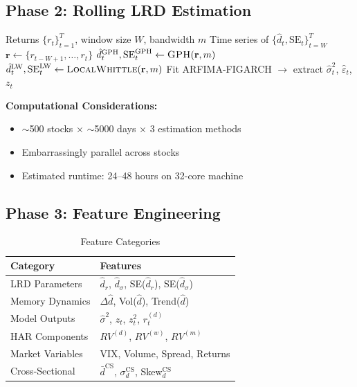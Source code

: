 \documentclass[11pt,a4paper]{article}
\theoremstyle{definition}
\newcommand{\dhat}{\hat{d}}
\newcommand{\sigmahat}{\hat{\sigma}}
\begin{document}
\subsection{Phase 2: Rolling LRD Estimation}

\begin{algorithm}[H]
\caption{Rolling Window LRD Estimation}
\begin{algorithmic}[1]
\Require Returns $\{r_t\}_{t=1}^T$, window size $W$, bandwidth $m$
\Ensure Time series of $\{\dhat_t, \text{SE}_t\}_{t=W}^T$
    \State $\mathbf{r} \gets \{r_{t-W+1}, \ldots, r_t\}$
    \State $\dhat_t^{\text{GPH}}, \text{SE}_t^{\text{GPH}} \gets \textsc{GPH}(\mathbf{r}, m)$
    \State $\dhat_t^{\text{LW}}, \text{SE}_t^{\text{LW}} \gets \textsc{LocalWhittle}(\mathbf{r}, m)$
    \State Fit ARFIMA-FIGARCH $\to$ extract $\sigmahat_t^2$, $\hat{\varepsilon}_t$, $z_t$
\EndFor
\end{algorithmic}
\end{algorithm}

\textbf{Computational Considerations:}
\begin{itemize}
    \item $\sim$500 stocks $\times$ $\sim$5000 days $\times$ 3 estimation methods
    \item Embarrassingly parallel across stocks
    \item Estimated runtime: 24--48 hours on 32-core machine
\end{itemize}

\subsection{Phase 3: Feature Engineering}

\begin{table}[htbp]
\centering
\caption{Feature Categories}
\begin{tabular}{@{}p{3cm}p{9cm}@{}}
\toprule
\textbf{Category} & \textbf{Features} \\
\midrule
LRD Parameters & $\dhat_r$, $\dhat_\sigma$, SE($\dhat_r$), SE($\dhat_\sigma$) \\
Memory Dynamics & $\Delta\dhat$, Vol($\dhat$), Trend($\dhat$) \\
Model Outputs & $\sigmahat^2$, $z_t$, $z_t^2$, $r_t^{(d)}$ \\
HAR Components & $RV^{(d)}$, $RV^{(w)}$, $RV^{(m)}$ \\
Market Variables & VIX, Volume, Spread, Returns \\
Cross-Sectional & $\bar{d}^{\text{CS}}$, $\sigma_d^{\text{CS}}$, Skew$_d^{\text{CS}}$ \\
\bottomrule
\end{tabular}
\end{table}
\end{document}

